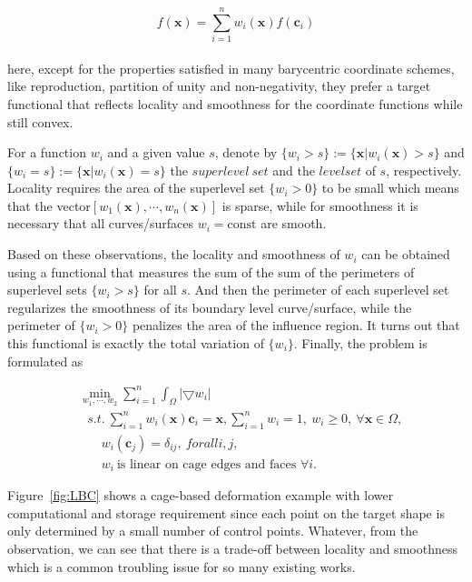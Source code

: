 \small{
\begin{equation}
 \label{eq:BC}
 f(\mathbf{x}) = \sum_{i=1}^{n}w_{i}(\mathbf{x})f(\mathbf{c}_{i})
\end{equation}
}
\\
here, except for the properties satisfied in many barycentric coordinate schemes, like reproduction, partition of unity and non-negativity, they prefer a target functional that reflects locality and smoothness for the coordinate functions while still convex.

For a function $w_{i}$ and a given value $s$, denote by $\{w_{i}>s\}:=\{\mathbf{x}|w_{i}(\mathbf{x})>s\}$ and $\{w_{i}=s\}:=\{\mathbf{x}|w_{i}(\mathbf{x})=s\}$ the $superlevel~set$ and the $level set$ of $s$, respectively.
Locality requires the area of the superlevel set $\{w_{i}>0\}$ to be small which means that the vector$[w_{1}(\mathbf{x}), \cdots, w_{n}(\mathbf{x})]$ is sparse, while for smoothness it is necessary that all curves/surfaces $w_{i}=\textrm{const}$ are smooth.

Based on these observations, the locality and smoothness of $w_{i}$ can be obtained using a functional that measures the sum of the sum of the perimeters of superlevel sets $\{w_{i}>s\}$ for all $s$.
And then the perimeter of each superlevel set regularizes the smoothness of its boundary level curve/surface, while the perimeter of $\{w_{i}>0\}$ penalizes the area of the influence region. It turns out that this functional is exactly the total variation of $\{w_{i}\}$. Finally, the problem is formulated as

\small{
\begin{equation}
 \label{eq:LBC}
 \begin{aligned}
 & \min_{w_1, \cdots, w_2} \sum_{i=1}^{n} \int_{\Omega}^{} |\bigtriangledown w_{i}| \\
 & ~~~s.t.~ \sum_{i=1}^{n}w_{i}(\mathbf{x})\mathbf{c}_{i}=\mathbf{x},
        \sum_{i=1}^{n}w_{i}=1,~w_{i}\geq0,~\forall \mathbf{x}\in\Omega,\\
 & ~~~~~~~~w_{i}(\mathbf{c}_{j})=\delta_{ij},~forall i,j,\\
 & ~~~~~~~~w_{i}~\textrm{is linear on cage edges and faces }\forall i.
 \end{aligned}
\end{equation}
}

Figure~\ref{fig:LBC} shows a cage-based deformation example with lower computational and storage requirement since each point on the target shape is only determined by a small number of control points.
Whatever, from the observation, we can see that there is a trade-off between locality and smoothness which is a common troubling issue for so many existing works.

